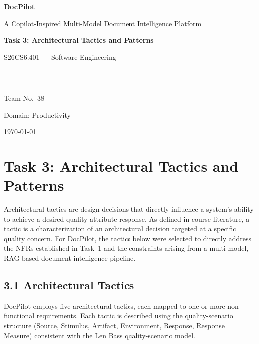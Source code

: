 \documentclass[12pt,a4paper]{article}
\begin{document}
\begin{titlepage}
    \centering
    \vspace*{2cm}
    {\Huge\bfseries\color{headingblue} DocPilot\par}
    \vspace{0.5cm}
    {\Large A Copilot-Inspired Multi-Model Document Intelligence Platform\par}
    \vspace{1.5cm}
    {\large\bfseries Task 3: Architectural Tactics and Patterns\par}
    \vspace{0.5cm}
    {\large S26CS6.401 --- Software Engineering\par}
    \vspace{1cm}
    \rule{0.5\textwidth}{0.4pt}\\[0.5cm]
    {\large Team No.\ 38\par}
    \vspace{0.5cm}
    {\normalsize Domain: Productivity\par}
    \vfill
    {\normalsize \today\par}
\end{titlepage}

\tableofcontents
\newpage

\section{Task 3: Architectural Tactics and Patterns}

Architectural tactics are design decisions that directly influence a system's ability to achieve a
desired quality attribute response. As defined in course literature, a tactic is a characterization
of an architectural decision targeted at a specific quality concern. For DocPilot, the tactics below
were selected to directly address the NFRs established in Task~1 and the constraints arising from a
multi-model, RAG-based document intelligence pipeline.

\subsection{3.1 Architectural Tactics}

DocPilot employs five architectural tactics, each mapped to one or more non-functional requirements.
Each tactic is described using the quality-scenario structure (Source, Stimulus, Artifact,
Environment, Response, Response Measure) consistent with the Len Bass quality-scenario model.
\end{document}
